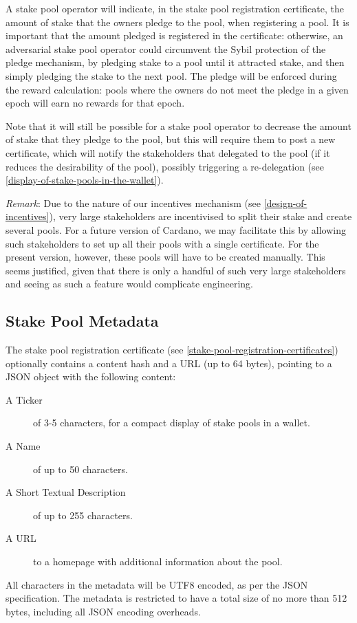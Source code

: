 \documentclass[11pt,a4paper,dvipsnames,twosided]{article}
\begin{document}
A stake pool operator will indicate, in the stake pool registration
certificate, the amount of stake that the owners pledge to
the pool, when registering a pool. It is important that the amount
pledged is registered in the certificate: otherwise,
an adversarial stake pool operator could circumvent the Sybil protection
of the pledge mechanism, by pledging stake to a pool until it attracted stake,
and then simply pledging the stake to the next pool. The pledge will be
enforced during the reward calculation: pools where the owners do not meet the
pledge in a given epoch will earn no rewards for that epoch.

Note that it will still be possible for a stake pool operator to decrease the
amount of stake that they pledge to the pool, but this will require them to post
a new certificate, which will notify the stakeholders that delegated to the pool
(if it reduces the desirability of the pool), possibly triggering a
re-delegation (see \cref{display-of-stake-pools-in-the-wallet}).

\emph{Remark}: Due to the nature of our incentives mechanism (see
\cref{design-of-incentives}), very large stakeholders are
incentivised to split their stake and create several pools. For a future
version of Cardano, we may facilitate this by allowing such
stakeholders to set up all their pools with a single certificate. For
the present version, however, these pools will have to be created
manually. This seems justified, given that there is only a handful of
such very large stakeholders and seeing as such a feature would
complicate engineering.

\subsection{Stake Pool Metadata}
\label{stake-pool-metadata}

The stake pool registration certificate
(see \cref{stake-pool-registration-certificates}) optionally contains a content
hash and a URL (up to 64 bytes), pointing to a JSON object with the following
content:

\begin{description}
\item[A Ticker]
  of 3-5 characters, for a compact display of stake pools in a
  wallet.
\item[A Name]
  of up to 50 characters.
\item[A Short Textual Description]
  of up to 255 characters.
\item[A URL]
  to a homepage with additional information about the pool.
\end{description}
All characters in the metadata will be UTF8 encoded, as per the JSON
specification. The metadata is restricted to have a total size of no more than
512 bytes, including all JSON encoding overheads.
\end{document}

